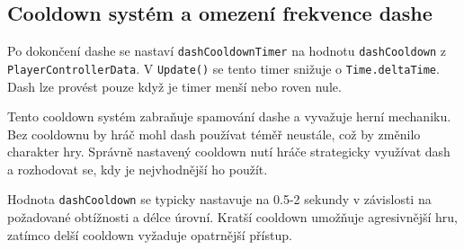 \subsection{Cooldown systém a omezení frekvence dashe}

Po dokončení dashe se nastaví \texttt{dashCooldownTimer} na hodnotu \texttt{dashCooldown} z \texttt{PlayerControllerData}. V \texttt{Update()} se tento timer snižuje o \texttt{Time.deltaTime}. Dash lze provést pouze když je timer menší nebo roven nule.

Tento cooldown systém zabraňuje spamování dashe a vyvažuje herní mechaniku. Bez cooldownu by hráč mohl dash používat téměř neustále, což by změnilo charakter hry. Správně nastavený cooldown nutí hráče strategicky využívat dash a rozhodovat se, kdy je nejvhodnější ho použít.

Hodnota \texttt{dashCooldown} se typicky nastavuje na 0.5-2 sekundy v závislosti na požadované obtížnosti a délce úrovní. Kratší cooldown umožňuje agresivnější hru, zatímco delší cooldown vyžaduje opatrnější přístup.